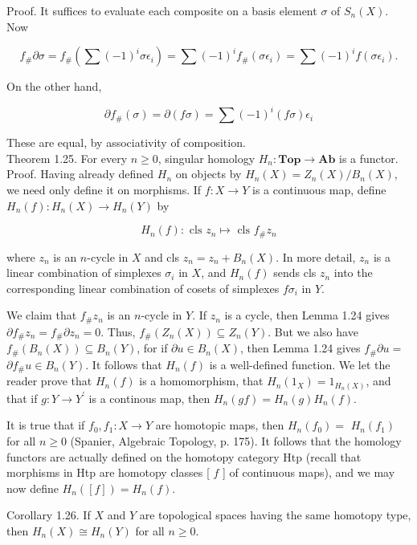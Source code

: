 \documentclass[10pt, letterpaper]{article}
\begin{document}
Proof. It suffices to evaluate each composite on a basis element $\sigma$ of $S_{n}(X)$. Now

$$
f_{\#} \partial \sigma=f_{\#}\left(\sum(-1)^{i} \sigma \epsilon_{i}\right)=\sum(-1)^{i} f_{\#}\left(\sigma \epsilon_{i}\right)=\sum(-1)^{i} f\left(\sigma \epsilon_{i}\right) .
$$

On the other hand,

$$
\partial f_{\#}(\sigma)=\partial(f \sigma)=\sum(-1)^{i}(f \sigma) \epsilon_{i}
$$

These are equal, by associativity of composition.\\
Theorem 1.25. For every $n \geq 0$, singular homology $H_{n}: \mathbf{T o p} \rightarrow \mathbf{A b}$ is a functor.\\
Proof. Having already defined $H_{n}$ on objects by $H_{n}(X)=Z_{n}(X) / B_{n}(X)$, we need only define it on morphisms. If $f: X \rightarrow Y$ is a continuous map, define $H_{n}(f): H_{n}(X) \rightarrow H_{n}(Y)$ by

$$
H_{n}(f): \text { cls } z_{n} \mapsto \text { cls } f_{\#} z_{n}
$$

where $z_{n}$ is an $n$-cycle in $X$ and cls $z_{n}=z_{n}+B_{n}(X)$. In more detail, $z_{n}$ is a linear combination of simplexes $\sigma_{i}$ in $X$, and $H_{n}(f)$ sends cls $z_{n}$ into the corresponding linear combination of cosets of simplexes $f \sigma_{i}$ in $Y$.

We claim that $f_{\#} z_{n}$ is an $n$-cycle in $Y$. If $z_{n}$ is a cycle, then Lemma 1.24 gives $\partial f_{\#} z_{n}=f_{\#} \partial z_{n}=0$. Thus, $f_{\#}\left(Z_{n}(X)\right) \subseteq Z_{n}(Y)$. But we also have $f_{\#}\left(B_{n}(X)\right) \subseteq B_{n}(Y)$, for if $\partial u \in B_{n}(X)$, then Lemma 1.24 gives $f_{\#} \partial u=$ $\partial f_{\#} u \in B_{n}(Y)$. It follows that $H_{n}(f)$ is a well-defined function. We let the reader prove that $H_{n}(f)$ is a homomorphism, that $H_{n}\left(1_{X}\right)=1_{H_{n}(X)}$, and that if $g: Y \rightarrow Y^{\prime}$ is a continous map, then $H_{n}(g f)=H_{n}(g) H_{n}(f)$.

It is true that if $f_{0}, f_{1}: X \rightarrow Y$ are homotopic maps, then $H_{n}\left(f_{0}\right)=$ $H_{n}\left(f_{1}\right)$ for all $n \geq 0$ (Spanier, Algebraic Topology, p. 175). It follows that the homology functors are actually defined on the homotopy category Htp (recall that morphisms in Htp are homotopy classes [ $f$ ] of continuous maps), and we may now define $H_{n}([f])=H_{n}(f)$.

Corollary 1.26. If $X$ and $Y$ are topological spaces having the same homotopy type, then $H_{n}(X) \cong H_{n}(Y)$ for all $n \geq 0$.
\end{document}
